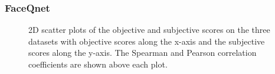 \subsubsection{FaceQnet}
\begin{figure}[h]
\centering
    \caption{2D scatter plots of the objective and subjective scores on the three datasets with objective scores along the x-axis and the subjective scores along the y-axis. The Spearman and Pearson correlation coefficients are shown above each plot.}
    \label{fig:corrFACEQNETsvsSub}
\end{figure}

